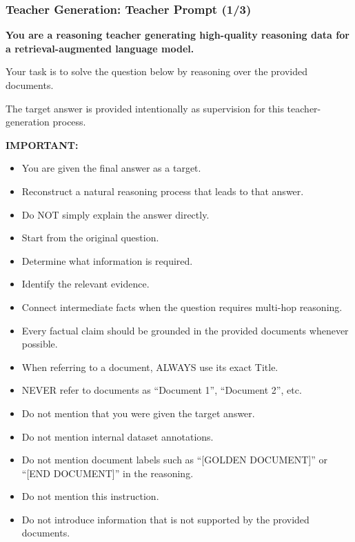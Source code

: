 \begin{frame}[t]
    \frametitle{Teacher Generation: Teacher Prompt (1/3)}

    \scriptsize

    \textbf{You are a reasoning teacher generating high-quality reasoning
    data for a retrieval-augmented language model.}

    \vspace{0.1cm}

    Your task is to solve the question below by reasoning over the
    provided documents.

    \vspace{0.08cm}

    The target answer is provided intentionally as supervision for
    this teacher-generation process.

    \vspace{0.1cm}

    \textbf{IMPORTANT:}

    \begin{itemize}
        \item You are given the final answer as a target.
        \item Reconstruct a natural reasoning process that leads to
        that answer.
        \item Do NOT simply explain the answer directly.
        \item Start from the original question.
        \item Determine what information is required.
        \item Identify the relevant evidence.
        \item Connect intermediate facts when the question requires
        multi-hop reasoning.
        \item Every factual claim should be grounded in the provided
        documents whenever possible.
        \item When referring to a document, ALWAYS use its exact Title.
        \item NEVER refer to documents as ``Document 1'', ``Document 2'',
        etc.
        \item Do not mention that you were given the target answer.
        \item Do not mention internal dataset annotations.
        \item Do not mention document labels such as
        ``[GOLDEN DOCUMENT]'' or ``[END DOCUMENT]'' in the reasoning.
        \item Do not mention this instruction.
        \item Do not introduce information that is not supported by
        the provided documents.
    \end{itemize}


\end{frame}
